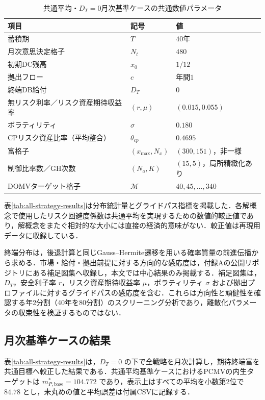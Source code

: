\documentclass[10pt,a4paper]{article}
\theoremstyle{plain}
\theoremstyle{definition}
\begin{document}
\begin{table}[H]
\centering
\caption{共通平均・$D_T=0$月次基準ケースの共通数値パラメータ}
\label{tab:all-strategy-params}
\begin{tabular}{lll}
\toprule
項目 & 記号 & 値 \\
\midrule
蓄積期 & $T$ & $40$年 \\
月次意思決定格子 & $N_t$ & $480$ \\
初期DC残高 & $x_0$ & $1/12$ \\
拠出フロー & $c$ & 年間$1$ \\
終端DB給付 & $D_T$ & $0$ \\
無リスク利率／リスク資産期待収益率 & $(r,\mu)$ & $(0.015,0.055)$ \\
ボラティリティ & $\sigma$ & $0.180$ \\
CPリスク資産比率（平均整合） & $\theta_{cp}$ & $0.4695$ \\
富格子 & $(x_{\max},N_x)$ & $(300,151)$，非一様 \\
制御比率数／GH次数 & $(N_a,K)$ & $(15,5)$，局所精緻化あり \\
DOMVターゲット格子 & $\mathcal M$ & $40,45,\ldots,340$ \\
\bottomrule
\end{tabular}
\end{table}

表\ref{tab:all-strategy-results}は分布統計量とグライドパス指標を掲載した．各解概念で使用したリスク回避度係数は共通平均を実現するための数値的較正値であり，解概念をまたぐ相対的な大小には直接の経済的意味がない．較正値は再現用データに収録している．

終端分布は，後退計算と同じGauss--Hermite遷移を用いる確率質量の前進伝播から求める．市場・給付・拠出前提に対する方向的な感応度は，付録Aの公開リポジトリにある補足図集へ収録し，本文では中心結果のみ掲載する．補足図集は，$D_T$，安全利子率 $r$，リスク資産期待収益率 $\mu$，ボラティリティ $\sigma$ および拠出プロファイルに対するグライドパスの感応度を含む．これらは方向性と頑健性を確認する年2分割（40年を80分割）のスクリーニング分析であり，離散化パラメータの収束性を検証するものではない．

\subsection{月次基準ケースの結果}
\label{sec:monthly-baseline-results}

表\ref{tab:all-strategy-results}は，$D_T=0$ の下で全戦略を月次計算し，期待終端富を共通目標へ較正した結果である．共通平均基準ケースにおけるPCMVの内生ターゲットは $m_{P,\mathrm{base}}^*=104.772$ であり，表示上はすべての平均を小数第2位で $84.78$ とし，未丸めの値と平均誤差は付属CSVに記録する．
\end{document}
